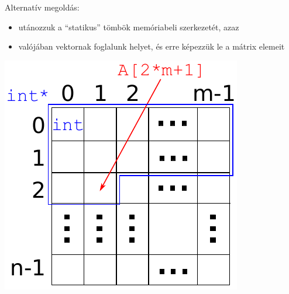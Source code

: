 \documentclass[usenames,dvipsnames,aspectratio=169]{beamer}
\begin{document}
\begin{frame}
  Alternatív megoldás:
  \begin{itemize}
    \item utánozzuk a ``statikus'' tömbök memóriabeli szerkezetét, azaz
    \item valójában vektornak foglalunk helyet, és erre képezzük le a mátrix elemeit
  \end{itemize}
  \begin{center}
    \includegraphics[scale=0.6]{matrix3.pdf}
  \end{center}
\end{frame}

\begin{frame}
  \scriptsize
  \begin{exampleblock}{}
    \vspace{-.2cm}
    
    \vspace{-.2cm}
  \end{exampleblock}
\end{frame}

\begin{frame}
  \begin{exampleblock}{}
    
  \end{exampleblock}
\end{frame}
\end{document}
